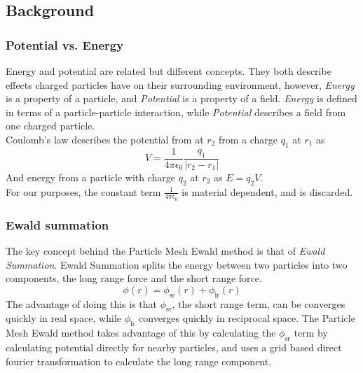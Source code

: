 \documentclass[pdftex,twoside,a4paper]{report}
\newcommand{\pmem}{Particle Mesh Ewald method}
\begin{document}
\subsection{Background}
\subsubsection{Potential vs. Energy}
Energy and potential are related but different concepts. They both describe effects charged particles have on their surrounding environment, however, \emph{Energy} is a property of a particle, and \emph{Potential} is a property of a field. \emph{Energy} is defined in terms of a particle-particle interaction, while \emph{Potential} describes a field from one charged particle.\\
Coulomb's law describes the potential from at $r_2$ from a charge $q_1$ at $r_1$ as 
\[V=\frac{1}{4\pi \epsilon_0} \frac{q_1}{|r_2 - r_1|}\]
And energy from a particle with charge $q_2$ at $r_2$ as $E = q_2 V$.\\
For our purposes, the constant term $\frac{1}{4\pi \epsilon_0}$ is material dependent, and is discarded.
\subsubsection{Ewald summation}
The key concept behind the \pmem{} is that of \emph{Ewald Summation}. Ewald Summation splits the energy between two particles into two components, the long range force and the short range force. \cite{petersen:3668}
\[
\phi(r) = \phi_{\text{sr}}(r) + \phi_{\text{lr}}(r)
\]
The advantage of doing this is that $\phi_{\text{sr}}$, the short range term, can be converges quickly in real space, while $\phi_{\text{lr}}$ converges quickly in reciprocal space. The \pmem{} takes advantage of this by calculating the $\phi_{\text{sr}}$ term by calculating potential directly for nearby particles, and uses a grid based direct fourier transformation to calculate the long range component.
\end{document}
